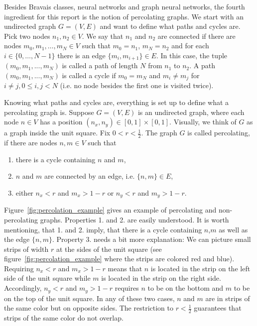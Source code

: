 Besides Bravais classes, neural networks and graph neural networks, the fourth ingredient for this report is the notion of percolating graphs.
We start with an undirected graph $G=(V,E)$ and want to define what paths and cycles are. Pick two nodes $n_1, n_2\in V$. We say that $n_1$ and $n_2$ are connected if
there are nodes $m_0,m_1,\dots,m_N\in V$ such that $m_0=n_1$, $m_N=n_2$ and for each $i\in\{0,\dots,N-1\}$ there is an edge $\{m_i,m_{i+1}\}\in E$.
In this case, the tuple $(m_0,m_1,...,m_N)$ is called a path of length $N$ from $n_1$ to $n_2$. 
A path $(m_0,m_1,...,m_N)$ is called a cycle if $m_0=m_N$ and $m_i\neq m_j$ for $i\neq j, 0\leq i,j<N$ 
(i.e. no node besides the first one is visited twice).

Knowing what paths and cycles are, everything is set up to define what a percolating graph is. 
Suppose $G=(V,E)$ is an undirected graph, where each node $n\in V$ has a position 
$(n_x,n_y)\in[0,1]\times[0,1]$. Visually, we think of $G$ as a graph inside the unit square.
Fix $0<r<\frac{1}{2}$. The graph $G$ is called percolating, if there are nodes $n,m\in V$ such that
\begin{enumerate}
    \item there is a cycle containing $n$ and $m$,
    \item $n$ and $m$ are connected by an edge, i.e. $\{n,m\}\in E$,
    \item either $n_x<r$ and $m_x>1-r$ or $n_y<r$ and $m_y>1-r$.
\end{enumerate}
Figure~\ref{fig:percolation_example} gives an example of percolating and non-percolating graphs. 
Properties 1. and 2. are easily understood. It is worth mentioning, that 1. and 2. imply, that there is a cycle containing $n$,$m$ as well as the edge $\{n,m\}$.
Property 3. needs a bit more explanation: We can picture small strips of width $r$ at the sides of the unit square 
(see figure~\ref{fig:percolation_example} where the strips are colored red and blue). 
Requiring $n_x<r$ and $m_x>1-r$ means that $n$ is located in the strip on the left side of the unit square while
$m$ is located in the strip on the right side. 
Accordingly, $n_y<r$ and $m_y>1-r$ requires $n$ to be on the bottom and $m$ to be on the top of the unit square.
In any of these two cases, $n$ and $m$ are in strips of the same color but on opposite sides.
The restriction to $r<\frac{1}{2}$ guarantees that strips of the same color do not overlap.
